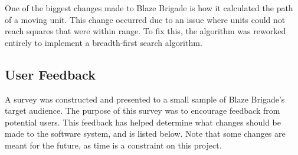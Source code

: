 \documentclass{article}
\begin{document}
One of the biggest changes made to Blaze Brigade is how it calculated the path of a moving unit. This change occurred due to an issue where units could not reach squares that were within range. To fix this, the algorithm was reworked entirely to implement a breadth-first search algorithm.

\subsection{User Feedback}

A survey was constructed and presented to a small sample of Blaze Brigade's target audience. The purpose of this survey was to encourage feedback from potential users. This feedback has helped determine what changes should be made to the software system, and is listed below. Note that some changes are meant for the future, as time is a constraint on this project.
\end{document}
